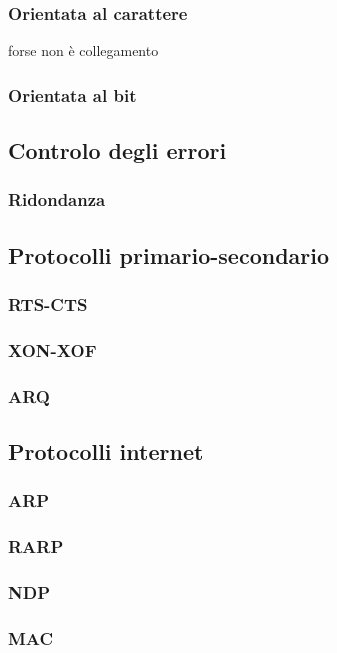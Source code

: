 \documentclass[a4paper,11pt]{paper}
\begin{document}
\subsubsection{Orientata al carattere} forse non è collegamento
\subsubsection{Orientata al bit}

\subsection{Controlo degli errori}
\subsubsection{Ridondanza}

\subsection{Protocolli primario-secondario}
\subsubsection{RTS-CTS}
\subsubsection{XON-XOF}
\subsubsection{ARQ}

\subsection{Protocolli internet}
\subsubsection{ARP}
\subsubsection{RARP}
\subsubsection{NDP}
\subsubsection{MAC}
\end{document}
